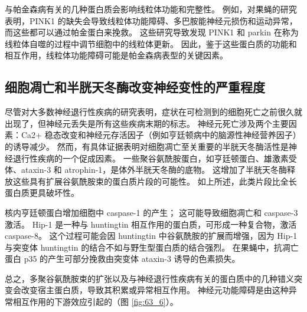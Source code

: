 与帕金森病有关的几种蛋白质会影响线粒体功能和完整性。
例如，对果蝇的研究表明，PINK1 的缺失会导致线粒体功能障碍、多巴胺能神经元损伤和运动异常，而这些都可以通过帕金蛋白来挽救。
这些研究导致发现 PINK1 和 parkin 在称为线粒体自噬的过程中调节细胞中的线粒体更新。
因此，鉴于这些蛋白质的功能和相互作用，线粒体功能障碍可能是帕金森病表型的关键因素。



\subsection{细胞凋亡和半胱天冬酶改变神经变性的严重程度}

尽管对大多数神经退行性疾病的研究表明，症状在可检测到的细胞死亡之前很久就出现了，但神经元丢失是所有这些疾病末期的标志。
神经元死亡涉及两个主要因素：Ca2+ 稳态改变和神经元存活因子（例如亨廷顿病中的脑源性神经营养因子）的诱导减少。
然而，有具体证据表明对细胞凋亡至关重要的半胱天冬酶活性是神经退行性疾病的一个促成因素。
一些聚谷氨酰胺蛋白，如亨廷顿蛋白、雄激素受体、ataxin-3 和 atrophin-1，是体外半胱天冬酶的底物。
这增加了半胱天冬酶释放这些具有扩展谷氨酰胺束的蛋白质片段的可能性。
如上所述，此类片段比全长蛋白质更具破坏性。


核内亨廷顿蛋白增加细胞中 caspase-1 的产生； 这可能导致细胞凋亡和 caspase-3 激活。
Hip-1 是一种与 huntingtin 相互作用的蛋白质，可形成一种复合物，激活 caspase-8。
这个过程可能会因 huntingtin 中谷氨酰胺的扩展而增强，因为 Hip-1 与突变体 huntingtin 的结合不如与野生型蛋白质的结合强烈。
在果蝇中，抗凋亡蛋白 p35 的产生可部分挽救由突变体 ataxin-3 诱导的色素损失。


总之，多聚谷氨酰胺束的扩张以及与神经退行性疾病有关的蛋白质中的几种错义突变会改变宿主蛋白质，导致其积累或异常相互作用。
神经元功能障碍是由这种异常相互作用的下游效应引起的（图 \ref{fig:63_6}）。


